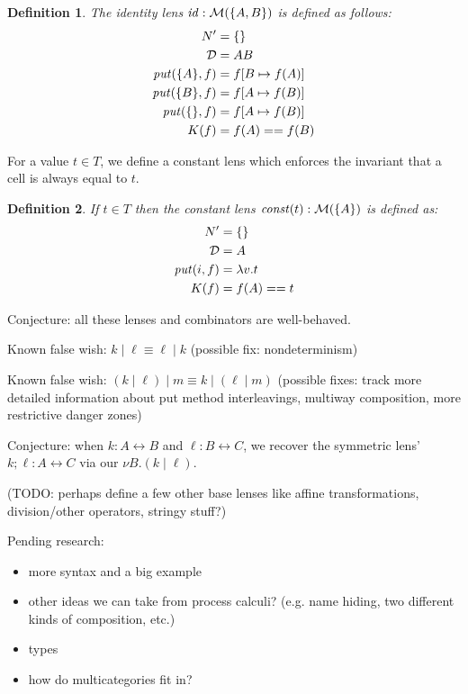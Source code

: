 \documentclass{article}
\newcommand{\lens}{\leftrightarrow}
\newtheorem{definition}{Definition}
\begin{document}
\newcommand{\id}{\mathit{id}}
\begin{definition}
    The identity lens $\id : \mlens{\{A,B\}}$ is defined as follows:
    \begin{align*}
        N' &= \{\} \\
        \mathcal D &= AB \\
        \mathit{put}(\{A\},f) &= f[B \mapsto f(A)] \\
        \mathit{put}(\{B\},f) &= f[A \mapsto f(B)] \\
        \mathit{put}(\{\},f) &= f[A \mapsto f(B)] \\
        K(f) &= f(A) == f(B)
    \end{align*}
\end{definition} 

For a value $t \in T$, we define a constant lens
which enforces the invariant that a cell is always
equal to $t$.

\newcommand{\const}{\mathit{const}}
\begin{definition}
    If $t \in T$ then the constant lens
    $\const(t) : \mlens{\{A\}}$ is defined as:
    \begin{align*}
        N' &= \{\} \\
        \mathcal D &= A \\
        \mathit{put}(i,f) &= \lambda v. t \\
        K(f) &= f(A) == t
    \end{align*}
\end{definition}

Conjecture: all these lenses and combinators are well-behaved.

Known false wish: $k \mid \ell \equiv \ell \mid k$ (possible fix:
nondeterminism)

Known false wish: $(k \mid \ell) \mid m \equiv k \mid (\ell \mid m)$
(possible fixes: track more detailed information about put method
interleavings, multiway composition, more restrictive danger zones)

Conjecture: when $k : A \lens B$ and $\ell : B \lens C$, we recover the
symmetric lens' $k;\ell : A \lens C$ via our $\nu B.(k \mid \ell)$.

(TODO: perhaps define a few other base lenses like affine transformations,
division/other operators, stringy stuff?)

Pending research:
\begin{itemize}
    \item more syntax and a big example
    \item other ideas we can take from process calculi? (e.g. name hiding,
        two different kinds of composition, etc.)
    \item types
    \item how do multicategories fit in?
\end{itemize}
\end{document}
